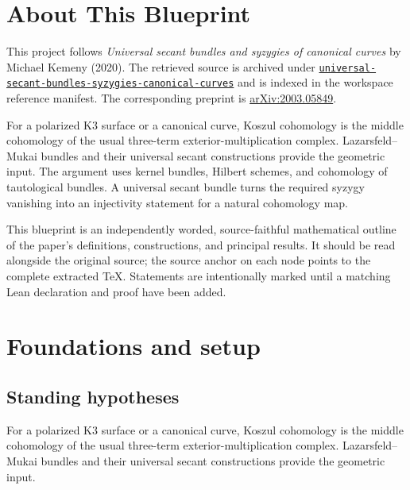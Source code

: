 

\chapter*{About This Blueprint}
\label{universal-secant-bundles-syzygies-canonical-curves-about}

This project follows \emph{Universal secant bundles and syzygies of canonical curves} by Michael Kemeny (2020). The
retrieved source is archived under
\href{../../../../../references/universal-secant-bundles-syzygies-canonical-curves/}{\texttt{universal-secant-bundles-syzygies-canonical-curves}} and is indexed in
the workspace reference manifest. The corresponding preprint is
\href{https://arxiv.org/abs/2003.05849}{arXiv:2003.05849}.

For a polarized K3 surface or a canonical curve, Koszul cohomology is the middle cohomology of the usual three-term exterior-multiplication complex. Lazarsfeld--Mukai bundles and their universal secant constructions provide the geometric input. The argument uses kernel bundles, Hilbert schemes, and cohomology of tautological bundles. A universal secant bundle turns the required syzygy vanishing into an injectivity statement for a natural cohomology map.

This blueprint is an independently worded, source-faithful mathematical
outline of the paper's definitions, constructions, and principal results. It
should be read alongside the original source; the source anchor on each node
points to the complete extracted TeX. Statements are intentionally marked
\notready until a matching Lean declaration and proof have been added.

\chapter{Foundations and setup}
\label{chap:universal-secant-bundles-syzygies-canonical-curves-foundations}

\section{Standing hypotheses}
\label{sec:universal-secant-bundles-syzygies-canonical-curves-standing}

For a polarized K3 surface or a canonical curve, Koszul cohomology is the middle cohomology of the usual three-term exterior-multiplication complex. Lazarsfeld--Mukai bundles and their universal secant constructions provide the geometric input.


